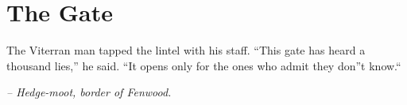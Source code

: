 \chapter*{The Gate}

The Viterran man tapped the lintel with his staff. ``This gate has heard a thousand lies,'' he said. ``It opens only for the ones who admit they don''t know.``

\smallskip

\noindent \textit{-- Hedge-moot, border of Fenwood.}

